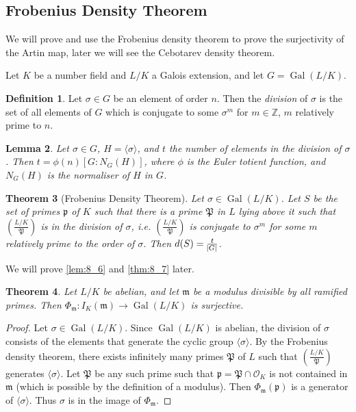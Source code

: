 \documentclass[11pt]{article}
\theoremstyle{definition}
\newtheorem{definition}{Definition}[section]
\theoremstyle{plain}
\newtheorem{theorem}[definition]{Theorem}
\newtheorem{lemma}[definition]{Lemma}
\theoremstyle{remark}
\DeclareMathOperator{\Gal}{Gal}
\newcommand{\ZZ}{\mathbb{Z}}
\newcommand{\cO}{\mathcal{O}}
\newcommand{\cp}{\mathfrak{P}}
\newcommand{\fp}{\mathfrak{p}}
\newcommand{\fm}{\mathfrak{m}}
\newcommand{\leg}[2]{\left(\frac{#1}{#2}\right)}
\begin{document}
\subsection{Frobenius Density Theorem}

We will prove and use the Frobenius density theorem to prove the surjectivity of the Artin map, later we will see the Cebotarev density theorem.

Let $K$ be a number field and $L/K$ a Galois extension, and let $G = \Gal(L/K)$.

\begin{definition}\label{def:8_5}
    Let $\sigma \in G$ be an element of order $n$. Then the \emph{division} of $\sigma$ is the set of all elements of $G$ which is conjugate to some $\sigma^m$ for $m \in \ZZ$, $m$ relatively prime to $n$.
\end{definition}

\begin{lemma}\label{lem:8_6}
    Let $\sigma \in G$, $H = \langle \sigma \rangle$, and $t$ the number of elements in the division of $\sigma$. Then $t = \phi(n) [G : N_G(H)]$, where $\phi$ is the Euler totient function, and $N_G(H)$ is the normaliser of $H$ in $G$.
\end{lemma}

\begin{theorem}[Frobenius Density Theorem]\label{thm:8_7}
    Let $\sigma \in \Gal(L/K)$. Let $S$ be the set of primes $\fp$ of $K$ such that there is a prime $\cp$ in $L$ lying above it such that $\leg{L/K}{\cp}$ is in the division of $\sigma$, i.e. $\leg{L/K}{\cp}$ is conjugate to $\sigma^m$ for some $m$ relatively prime to the order of $\sigma$. Then $d(S) = \frac{t}{\abs{G}}$.
\end{theorem}

\noindent We will prove \autoref{lem:8_6} and \autoref{thm:8_7} later.

\begin{theorem}\label{thm:8_8}
    Let $L/K$ be abelian, and let $\fm$ be a modulus divisible by all ramified primes. Then $\Phi_\fm : I_K(\fm) \to \Gal(L/K)$ is surjective.
\end{theorem}
\begin{proof}
    Let $\sigma \in \Gal(L/K)$. Since $\Gal(L/K)$ is abelian, the division of $\sigma$ consists of the elements that generate the cyclic group $\langle \sigma \rangle$. By the Frobenius density theorem, there exists infinitely many primes $\cp$ of $L$ such that $\leg{L/K}{\cp}$ generates $\langle \sigma \rangle$. Let $\cp$ be any such prime such that $\fp = \cp \cap \cO_K$ is not contained in $\fm$ (which is possible by the definition of a modulus). Then $\Phi_\fm(\fp)$ is a generator of $\langle \sigma \rangle$. Thus $\sigma$ is in the image of $\Phi_\fm$.
\end{proof}
\end{document}
